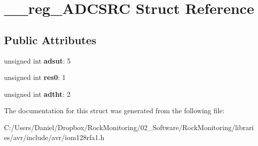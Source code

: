 \hypertarget{struct____reg___a_d_c_s_r_c}{}\section{\+\_\+\+\_\+reg\+\_\+\+A\+D\+C\+S\+RC Struct Reference}
\label{struct____reg___a_d_c_s_r_c}
\subsection*{Public Attributes}
\begin{DoxyCompactItemize}
\item 
unsigned int {\bfseries adsut}\+: 5\hypertarget{struct____reg___a_d_c_s_r_c_a82b06800677a7402aa38776f24fe7452}{}\label{struct____reg___a_d_c_s_r_c_a82b06800677a7402aa38776f24fe7452}

\item 
unsigned int {\bfseries res0}\+: 1\hypertarget{struct____reg___a_d_c_s_r_c_af940d3732586932baeb1493f4d7e7f90}{}\label{struct____reg___a_d_c_s_r_c_af940d3732586932baeb1493f4d7e7f90}

\item 
unsigned int {\bfseries adtht}\+: 2\hypertarget{struct____reg___a_d_c_s_r_c_af6770f9bfd9c0b0f84a3168382dc7748}{}\label{struct____reg___a_d_c_s_r_c_af6770f9bfd9c0b0f84a3168382dc7748}

\end{DoxyCompactItemize}


The documentation for this struct was generated from the following file\+:\begin{DoxyCompactItemize}
\item 
C\+:/\+Users/\+Daniel/\+Dropbox/\+Rock\+Monitoring/02\+\_\+\+Software/\+Rock\+Monitoring/libraries/avr/include/avr/iom128rfa1.\+h\end{DoxyCompactItemize}
